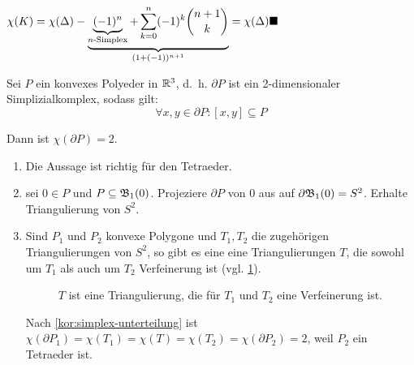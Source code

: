 \begin{beweis}
    $\chi(K) = \chi(\Delta) - \underbrace{\underbrace{(-1)^n}_{n\text{-Simplex}} + \sum_{k=0}^n (-1)^k \binom{n+1}{k}}_{(1+(-1))^{n+1}} = \chi(\Delta) \qed$
\end{beweis}

\begin{satz}%
    Sei $P$ ein konvexes Polyeder in $\mathbb{R}^3$, d.~h. $\partial P$ ist
    ein 2-dimensionaler Simplizialkomplex, sodass gilt:
    \[\forall x,y \in \partial P: [x,y] \subseteq P\]

    Dann ist $\chi(\partial P) = 2$.
\end{satz}

\begin{beweis}\leavevmode
    \begin{enumerate}[label=\arabic*)]
        \item Die Aussage ist richtig für den Tetraeder.
        \item \Obda{} sei $0 \in P$ und $P \subseteq \mathfrak{B}_1(0)$. Projeziere
              $\partial P$ von $0$ aus auf $\partial \mathfrak{B}_1(0) = S^2$.
              Erhalte Triangulierung von $S^2$.
        \item Sind $P_1$ und $P_2$ konvexe Polygone und $T_1, T_2$
              die zugehörigen Triangulierungen von $S^2$, so gibt es 
              eine eine Triangulierungen $T$, die sowohl um $T_1$ als
              auch um $T_2$ Verfeinerung ist (vgl. \cref{fig:topology-3}).

              \begin{figure}[htp]
                  \centering
                  
                  \caption{$T$ ist eine Triangulierung, die für $T_1$ und $T_2$ eine Verfeinerung ist.}
                  \label{fig:topology-3}
              \end{figure}

              Nach \cref{kor:simplex-unterteilung} ist
              $\chi(\partial P_1) = \chi(T_1) = \chi(T) = \chi(T_2) = \chi(\partial P_2) = 2$,
              weil \obda{} $P_2$ ein Tetraeder ist.
    \end{enumerate}
\end{beweis}

